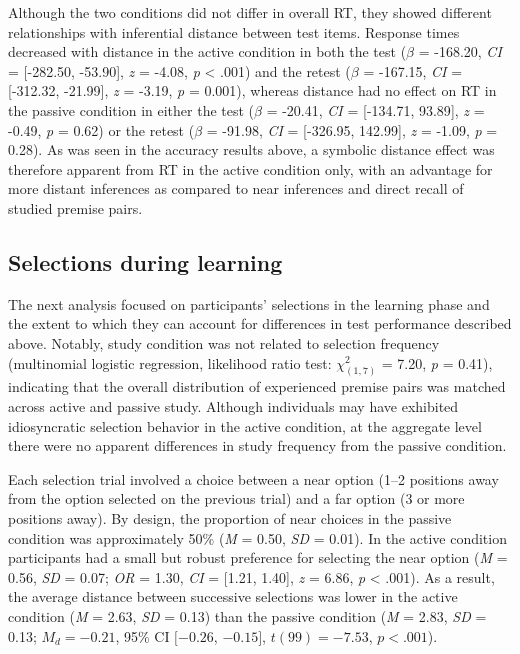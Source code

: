 \documentclass[floatsintext,man]{apa6}
\theoremstyle{definition}
\theoremstyle{definition}
\theoremstyle{definition}
\theoremstyle{remark}
\begin{document}
Although the two conditions did not differ in overall RT, they showed
different relationships with inferential distance between test items.
Response times decreased with distance in the active condition in both
the test (\(\beta\) = -168.20, \emph{CI} = {[}-282.50, -53.90{]},
\emph{z} = -4.08, \emph{p} \textless{} .001) and the retest (\(\beta\) =
-167.15, \emph{CI} = {[}-312.32, -21.99{]}, \emph{z} = -3.19, \emph{p} =
0.001), whereas distance had no effect on RT in the passive condition in
either the test (\(\beta\) = -20.41, \emph{CI} = {[}-134.71, 93.89{]},
\emph{z} = -0.49, \emph{p} = 0.62) or the retest (\(\beta\) = -91.98,
\emph{CI} = {[}-326.95, 142.99{]}, \emph{z} = -1.09, \emph{p} = 0.28).
As was seen in the accuracy results above, a symbolic distance effect
was therefore apparent from RT in the active condition only, with an
advantage for more distant inferences as compared to near inferences and
direct recall of studied premise pairs.

\subsection{Selections during
learning}\label{selections-during-learning}

The next analysis focused on participants' selections in the learning
phase and the extent to which they can account for differences in test
performance described above. Notably, study condition was not related to
selection frequency (multinomial logistic regression, likelihood ratio
test: \(\chi_{(1,7)}^2\) = 7.20, \emph{p} = 0.41), indicating that the
overall distribution of experienced premise pairs was matched across
active and passive study. Although individuals may have exhibited
idiosyncratic selection behavior in the active condition, at the
aggregate level there were no apparent differences in study frequency
from the passive condition.

Each selection trial involved a choice between a near option (1--2
positions away from the option selected on the previous trial) and a far
option (3 or more positions away). By design, the proportion of near
choices in the passive condition was approximately 50\% (\emph{M} =
0.50, \emph{SD} = 0.01). In the active condition participants had a
small but robust preference for selecting the near option (\emph{M} =
0.56, \emph{SD} = 0.07; \emph{OR} = 1.30, \emph{CI} = {[}1.21, 1.40{]},
\emph{z} = 6.86, \emph{p} \textless{} .001). As a result, the average
distance between successive selections was lower in the active condition
(\emph{M} = 2.63, \emph{SD} = 0.13) than the passive condition (\emph{M}
= 2.83, \emph{SD} = 0.13; \(M_d = -0.21\), 95\% CI \([-0.26\),
\(-0.15]\), \(t(99) = -7.53\), \(p < .001\)).
\end{document}
